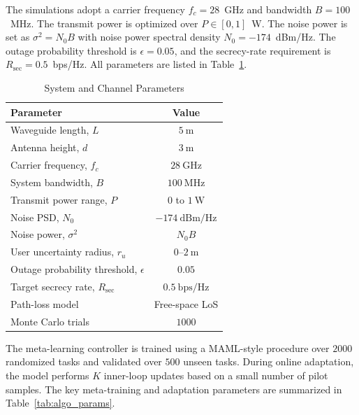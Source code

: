\documentclass[journal,10pt]{IEEEtran}
\begin{document}
The simulations adopt a carrier frequency $f_c=28$~GHz and bandwidth $B=100$~MHz. The transmit power is optimized over $P\in[0,1]$~W. The noise power is set as $\sigma^2 = N_0 B$ with noise power spectral density $N_0=-174$~dBm/Hz. The outage probability threshold is $\epsilon=0.05$, and the secrecy-rate requirement is $R_{\mathrm{sec}}=0.5$~bps/Hz. All parameters are listed in Table~\ref{tab:sys_params}.

\begin{table}[t]
\centering
\caption{System and Channel Parameters}
\label{tab:sys_params}
\begin{tabular}{l c}
\hline
\textbf{Parameter} & \textbf{Value} \\ \hline
Waveguide length, $L$ & $5~\mathrm{m}$ \\
Antenna height, $d$ & $3~\mathrm{m}$ \\
Carrier frequency, $f_c$ & $28~\mathrm{GHz}$ \\
System bandwidth, $B$ & $100~\mathrm{MHz}$ \\
Transmit power range, $P$ & $0$ to $1~\mathrm{W}$ \\
Noise PSD, $N_0$ & $-174~\mathrm{dBm/Hz}$ \\
Noise power, $\sigma^2$ & $N_0 B$ \\
User uncertainty radius, $r_u$ & $0$--$2~\mathrm{m}$ \\
Outage probability threshold, $\epsilon$ & $0.05$ \\
Target secrecy rate, $R_{\mathrm{sec}}$ & $0.5~\mathrm{bps/Hz}$ \\
Path-loss model & Free-space LoS \\
Monte Carlo trials & $1000$ \\
\hline
\end{tabular}
\end{table}

The meta-learning controller is trained using a MAML-style procedure over $2000$ randomized tasks and validated over $500$ unseen tasks. During online adaptation, the model performs $K$ inner-loop updates based on a small number of pilot samples. The key meta-training and adaptation parameters are summarized in Table~\ref{tab:algo_params}.
\end{document}
